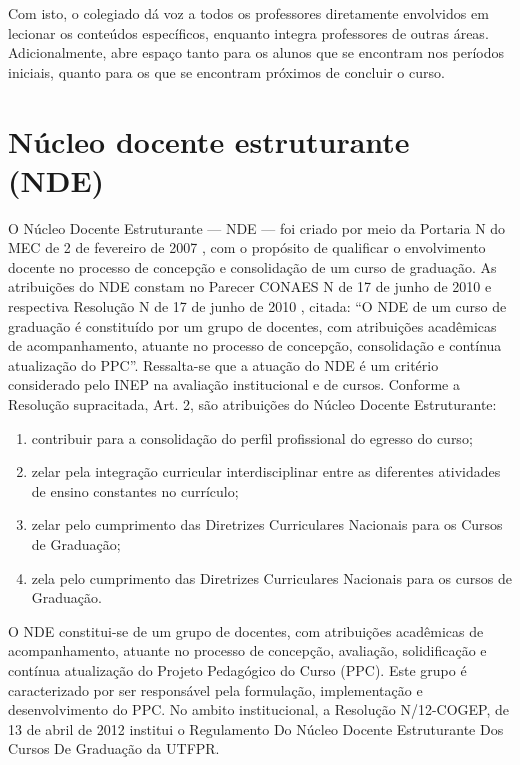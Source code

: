 Com isto, o colegiado dá voz a todos os professores diretamente envolvidos em lecionar os conteúdos específicos, enquanto integra professores de outras áreas. Adicionalmente, abre espaço tanto para os alunos que se encontram nos períodos iniciais, quanto para os que se encontram próximos de concluir o curso.

\section{Núcleo docente estruturante (NDE)}

O Núcleo Docente Estruturante — NDE — foi criado por meio da Portaria N do MEC de 2 de fevereiro de 2007 \cite{portaria147mec}, com o propósito de qualificar o envolvimento docente no processo de concepção e consolidação de um curso de graduação. As atribuições do NDE constam no Parecer CONAES N de 17 de junho de 2010 \cite{parecerconaes4} e respectiva Resolução N de 17 de junho de 2010 \cite{resconaes1}, citada: ``O NDE de um curso de graduação é constituído por um grupo de docentes, com atribuições acadêmicas de acompanhamento, atuante no processo de concepção, consolidação e contínua atualização do PPC''. Ressalta-se que a atuação do NDE é um critério considerado pelo INEP na avaliação institucional e de cursos. Conforme a Resolução supracitada, Art. 2\textordmasculine, são atribuições do Núcleo Docente Estruturante: 

\begin{enumerate}
    \item contribuir para a consolidação do perfil profissional do egresso do curso;
    \item zelar pela integração curricular interdisciplinar entre as diferentes atividades de ensino constantes no currículo;
    \item zelar pelo cumprimento das Diretrizes Curriculares Nacionais para os Cursos de Graduação;
    \item zela pelo cumprimento das Diretrizes Curriculares Nacionais para os cursos de Graduação.
\end{enumerate}

O NDE constitui-se de um grupo de docentes, com atribuições acadêmicas de acompanhamento, atuante no processo de concepção, avaliação, solidificação e contínua atualização do Projeto Pedagógico do Curso (PPC). Este grupo é caracterizado por ser responsável pela formulação, implementação e desenvolvimento do PPC. No ambito institucional, a Resolução N/12-COGEP, de 13 de abril de 2012 \cite{cogep9} institui o Regulamento Do Núcleo Docente Estruturante Dos Cursos De Graduação da UTFPR.

